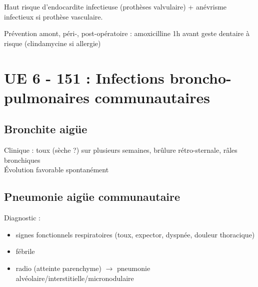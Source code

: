 \documentclass{article}
\begin{document}
Haut risque d'endocardite infectieuse (prothèses valvulaire) + anévrisme
infectieux si prothèse vasculaire.

Prévention amont, péri-, post-opératoire : 
amoxicilline 1h avant geste dentaire à risque (clindamycine si allergie)

\section{UE 6 - 151 : Infections broncho-pulmonaires communautaires}

\subsection{Bronchite aigüe}

Clinique : toux (sèche ?) sur plusieurs semaines, brûlure
rétro-sternale, râles bronchiques\\
Évolution favorable spontanément

\subsection{Pneumonie aigüe communautaire}

Diagnostic :

\begin{itemize}
\item signes fonctionnels respiratoires (toux, expector, dyspnée, douleur
  thoracique)
\item fébrile
\item radio (atteinte parenchyme) $\to$ pneumonie
  alvéolaire/interstitielle/micronodulaire
\end{itemize}
\end{document}
